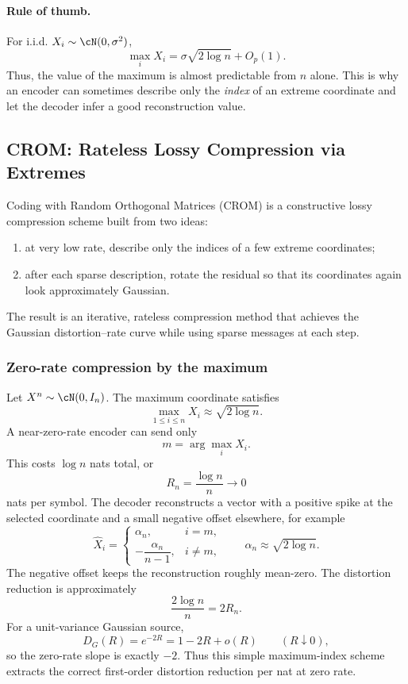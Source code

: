 \paragraph{Rule of thumb.}
For i.i.d. $X_i\sim\cN(0,\sigma^2)$,
\begin{equation}
    \max_i X_i = \sigma\sqrt{2\log n}+O_p(1).
\end{equation}
Thus, the value of the maximum is almost predictable from $n$ alone.
This is why an encoder can sometimes describe only the \emph{index} of an extreme coordinate and let the decoder infer a good reconstruction value.

\subsection{CROM: Rateless Lossy Compression via Extremes}
\label{subsec:crom}

Coding with Random Orthogonal Matrices (CROM) is a constructive lossy compression scheme built from two ideas:
\begin{enumerate}[leftmargin=2em]
    \item at very low rate, describe only the indices of a few extreme coordinates;
    \item after each sparse description, rotate the residual so that its coordinates again look approximately Gaussian.
\end{enumerate}
The result is an iterative, rateless compression method that achieves the Gaussian distortion--rate curve while using sparse messages at each step.

\subsubsection*{Zero-rate compression by the maximum}

Let $X^n\sim\cN(0,I_n)$.
The maximum coordinate satisfies
\[
    \max_{1\le i\le n}X_i\approx \sqrt{2\log n}.
\]
A near-zero-rate encoder can send only
\[
    m=\arg\max_i X_i.
\]
This costs $\log n$ nats total, or
\[
    R_n=\frac{\log n}{n}\to 0
\]
nats per symbol.
The decoder reconstructs a vector with a positive spike at the selected coordinate and a small negative offset elsewhere, for example
\begin{equation}
\widehat X_i=
\begin{cases}
\alpha_n, & i=m,\\
-\dfrac{\alpha_n}{n-1}, & i\neq m,
\end{cases}
\qquad \alpha_n\approx \sqrt{2\log n}.
\end{equation}
The negative offset keeps the reconstruction roughly mean-zero.
The distortion reduction is approximately
\[
    \frac{2\log n}{n}=2R_n.
\]
For a unit-variance Gaussian source,
\[
    D_G(R)=e^{-2R}=1-2R+o(R)
    \qquad (R\downarrow 0),
\]
so the zero-rate slope is exactly $-2$.
Thus this simple maximum-index scheme extracts the correct first-order distortion reduction per nat at zero rate.

